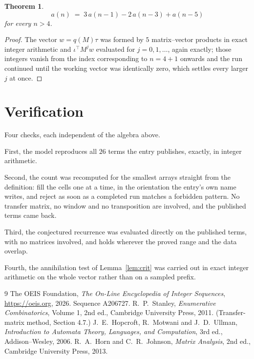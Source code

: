 \documentclass[11pt,a4paper]{article}
\theoremstyle{plain}
\newtheorem{theorem}{Theorem}
\theoremstyle{definition}
\begin{document}
\begin{theorem}
\[
a(n)\;=\;3\,a(n-1) - 2\,a(n-3) + a(n-5)
\]
for every $n>4$.
\end{theorem}

\begin{proof}
The vector $w=q(M)\tau$ was formed by $5$ matrix--vector products in exact integer
arithmetic and $\iota^{\!\top}M^{j}w$ evaluated for $j=0,1,\dots$, again exactly; those
integers vanish from the index corresponding to $n=4+1$ onwards and the run continued
until the working vector was identically zero, which settles every larger $j$ at once.
\end{proof}

\section{Verification}

Four checks, each independent of the algebra above.

First, the model reproduces all $26$ terms the entry publishes, exactly, in integer
arithmetic.

Second, the count was recomputed for the smallest arrays straight from the definition: fill the
cells one at a time, in the orientation the entry's own name writes, and reject as soon as a
completed run matches a forbidden pattern. No transfer matrix, no window and no transposition
are involved, and the published terms came back.

Third, the conjectured recurrence was evaluated directly on the published terms, with no
matrices involved, and holds wherever the proved range and the data overlap.

Fourth, the annihilation test of Lemma~\ref{lem:crit} was carried out in exact integer
arithmetic on the whole vector rather than on a sampled prefix.

\begin{thebibliography}{9}
 The OEIS Foundation, \emph{The On-Line Encyclopedia of Integer
Sequences}, \url{https://oeis.org}, 2026. Sequence A206727.
 R.~P.~Stanley, \emph{Enumerative Combinatorics}, Volume 1, 2nd ed.,
Cambridge University Press, 2011. (Transfer-matrix method, Section 4.7.)
 J.~E.~Hopcroft, R.~Motwani and J.~D.~Ullman, \emph{Introduction to Automata
Theory, Languages, and Computation}, 3rd ed., Addison--Wesley, 2006.
 R.~A.~Horn and C.~R.~Johnson, \emph{Matrix Analysis}, 2nd ed., Cambridge
University Press, 2013.
\end{thebibliography}
\end{document}
